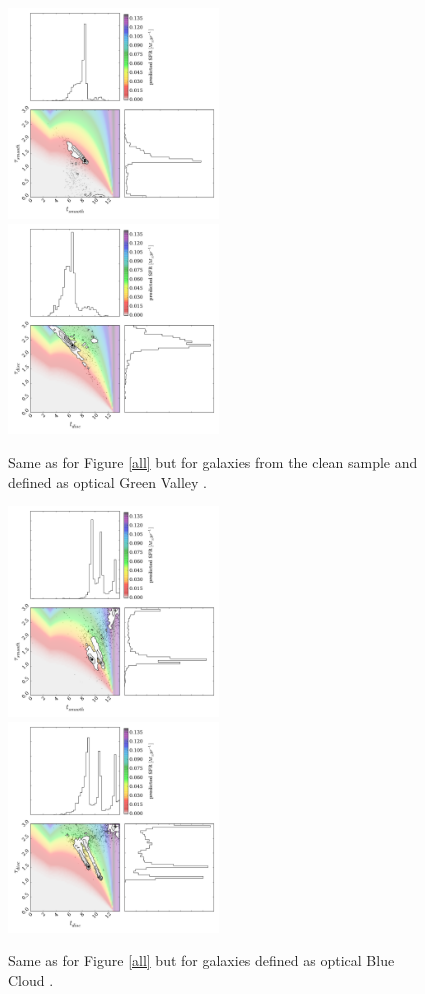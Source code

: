 \documentclass{mn2e}
\begin{document}
\begin{figure}
\includegraphics[width=0.4975\textwidth]{gv_smooth_clean.pdf}
\includegraphics[width=0.4975\textwidth]{gv_disc_clean.pdf}
\caption{Same as for Figure \ref{all} but for galaxies from the clean sample and defined as optical Green Valley \cite{Baldry}.}
\label{gv_clean}
\end{figure}

\begin{figure}
\includegraphics[width=0.4975\textwidth]{blue_c_smooth.pdf}
\includegraphics[width=0.4975\textwidth]{blue_c_disc.pdf}
\caption{Same as for Figure \ref{all} but for galaxies defined as optical Blue Cloud \cite{Baldry}.}
\label{blue_c}
\end{figure}
\end{document}
